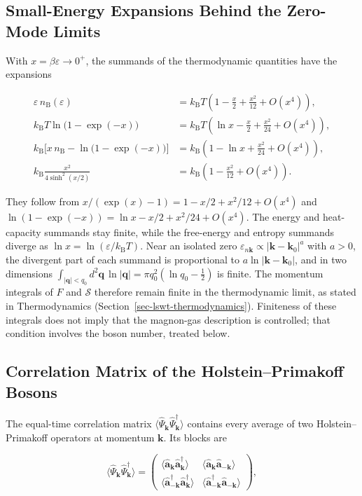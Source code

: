 \subsection{Small-Energy Expansions Behind the Zero-Mode Limits}

With \(x=\beta\varepsilon\to0^+\), the summands of the thermodynamic quantities have the expansions

\[
\begin{aligned}
\varepsilon\,n_{\mathrm B}(\varepsilon)&=k_{\mathrm B}T\left(1-\frac x2+\frac{x^2}{12}+O(x^4)\right),\\
k_{\mathrm B}T\ln\big(1-\exp(-x)\big)&=k_{\mathrm B}T\left(\ln x-\frac x2+\frac{x^2}{24}+O(x^4)\right),\\
k_{\mathrm B}\Big[x\,n_{\mathrm B}-\ln\big(1-\exp(-x)\big)\Big]&=k_{\mathrm B}\left(1-\ln x+\frac{x^2}{24}+O(x^4)\right),\\
k_{\mathrm B}\frac{x^2}{4\sinh^2(x/2)}&=k_{\mathrm B}\left(1-\frac{x^2}{12}+O(x^4)\right).
\end{aligned}
\]

They follow from \(x/(\exp(x)-1)=1-x/2+x^2/12+O(x^4)\) and \(\ln(1-\exp(-x))=\ln x-x/2+x^2/24+O(x^4)\). The energy and heat-capacity summands stay finite, while the free-energy and entropy summands diverge as \(\ln x=\ln(\varepsilon/k_{\mathrm B}T)\). Near an isolated zero \(\varepsilon_{n\mathbf k}\propto|\mathbf k-\mathbf k_0|^a\) with \(a>0\), the divergent part of each summand is proportional to \(a\ln|\mathbf k-\mathbf k_0|\), and in two dimensions \(\int_{|\mathbf q|<q_0}d^2\mathbf q\,\ln|\mathbf q|=\pi q_0^2(\ln q_0-\frac12)\) is finite. The momentum integrals of \(F\) and \(\mathcal S\) therefore remain finite in the thermodynamic limit, as stated in Thermodynamics (Section~\ref{sec-lswt-thermodynamics}). Finiteness of these integrals does not imply that the magnon-gas description is controlled; that condition involves the boson number, treated below.

\subsection{Correlation Matrix of the Holstein--Primakoff Bosons}

The equal-time correlation matrix \(\langle\hat\Psi_{\mathbf k}\hat\Psi_{\mathbf k}^\dagger\rangle\) contains every average of two Holstein--Primakoff operators at momentum \(\mathbf k\). Its blocks are

\[
\big\langle\hat\Psi_{\mathbf k}\hat\Psi_{\mathbf k}^\dagger\big\rangle
=\begin{pmatrix}
\langle\hat{\mathbf a}_{\mathbf k}\hat{\mathbf a}_{\mathbf k}^\dagger\rangle & \langle\hat{\mathbf a}_{\mathbf k}\hat{\mathbf a}_{-\mathbf k}\rangle\\
\langle\hat{\mathbf a}_{-\mathbf k}^\dagger\hat{\mathbf a}_{\mathbf k}^\dagger\rangle & \langle\hat{\mathbf a}_{-\mathbf k}^\dagger\hat{\mathbf a}_{-\mathbf k}\rangle
\end{pmatrix},
\]


